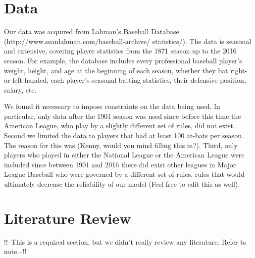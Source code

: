 \documentclass[10pt,a4paper]{article}
\begin{document}
\section*{\large Data}
Our data was acquired from Lahman's Baseball Database (http://www.seanlahman.com/baseball-archive/
statistics/). The data is seasonal and extensive, covering player statistics from the 1871 season up to the 2016 season. For example, the database includes every professional baseball player's weight, height, and age at the beginning of each season, whether they bat right- or left-handed, each player's seasonal batting statistics, their defensive position, salary, etc. \par
We found it necessary to impose constraints on the data being used. In particular, only data after the 1901 season was used since before this time the American League, who play by a slightly different set of rules, did not exist. Second we limited the data to players that had at least 100 at-bats per season. The reason for this was (Kenny, would you mind filling this in?). Third, only players who played in either the National League or the American League were included since between 1901 and 2016 there did exist other leagues in Major League Baseball who were governed by a different set of rules, rules that would ultimately decrease the reliability of our model (Feel free to edit this as well).
\section*{\large Literature Review}  
!!--This is a required section, but we didn't really review any literature. Refer to note.--!!
\end{document}
